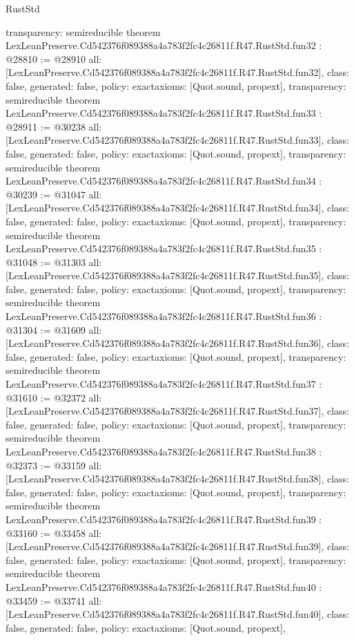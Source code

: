 \begin{lexlean}{RustStd}
\begin{coremodule}
{  transparency: semireducible
}
theorem LexLeanPreserve.Cd542376f089388a4a783f2fc4c26811f.R47.RustStd.fun32 : @28810 := @28910 {
  all: [LexLeanPreserve.Cd542376f089388a4a783f2fc4c26811f.R47.RustStd.fun32],
  class: false,
  generated: false,
  policy: exact{axioms: [Quot.sound, propext]},
  transparency: semireducible
}
theorem LexLeanPreserve.Cd542376f089388a4a783f2fc4c26811f.R47.RustStd.fun33 : @28911 := @30238 {
  all: [LexLeanPreserve.Cd542376f089388a4a783f2fc4c26811f.R47.RustStd.fun33],
  class: false,
  generated: false,
  policy: exact{axioms: [Quot.sound, propext]},
  transparency: semireducible
}
theorem LexLeanPreserve.Cd542376f089388a4a783f2fc4c26811f.R47.RustStd.fun34 : @30239 := @31047 {
  all: [LexLeanPreserve.Cd542376f089388a4a783f2fc4c26811f.R47.RustStd.fun34],
  class: false,
  generated: false,
  policy: exact{axioms: [Quot.sound, propext]},
  transparency: semireducible
}
theorem LexLeanPreserve.Cd542376f089388a4a783f2fc4c26811f.R47.RustStd.fun35 : @31048 := @31303 {
  all: [LexLeanPreserve.Cd542376f089388a4a783f2fc4c26811f.R47.RustStd.fun35],
  class: false,
  generated: false,
  policy: exact{axioms: [Quot.sound, propext]},
  transparency: semireducible
}
theorem LexLeanPreserve.Cd542376f089388a4a783f2fc4c26811f.R47.RustStd.fun36 : @31304 := @31609 {
  all: [LexLeanPreserve.Cd542376f089388a4a783f2fc4c26811f.R47.RustStd.fun36],
  class: false,
  generated: false,
  policy: exact{axioms: [Quot.sound, propext]},
  transparency: semireducible
}
theorem LexLeanPreserve.Cd542376f089388a4a783f2fc4c26811f.R47.RustStd.fun37 : @31610 := @32372 {
  all: [LexLeanPreserve.Cd542376f089388a4a783f2fc4c26811f.R47.RustStd.fun37],
  class: false,
  generated: false,
  policy: exact{axioms: [Quot.sound, propext]},
  transparency: semireducible
}
theorem LexLeanPreserve.Cd542376f089388a4a783f2fc4c26811f.R47.RustStd.fun38 : @32373 := @33159 {
  all: [LexLeanPreserve.Cd542376f089388a4a783f2fc4c26811f.R47.RustStd.fun38],
  class: false,
  generated: false,
  policy: exact{axioms: [Quot.sound, propext]},
  transparency: semireducible
}
theorem LexLeanPreserve.Cd542376f089388a4a783f2fc4c26811f.R47.RustStd.fun39 : @33160 := @33458 {
  all: [LexLeanPreserve.Cd542376f089388a4a783f2fc4c26811f.R47.RustStd.fun39],
  class: false,
  generated: false,
  policy: exact{axioms: [Quot.sound, propext]},
  transparency: semireducible
}
theorem LexLeanPreserve.Cd542376f089388a4a783f2fc4c26811f.R47.RustStd.fun40 : @33459 := @33741 {
  all: [LexLeanPreserve.Cd542376f089388a4a783f2fc4c26811f.R47.RustStd.fun40],
  class: false,
  generated: false,
  policy: exact{axioms: [Quot.sound, propext]},
}
\end{coremodule}
\end{lexlean}
